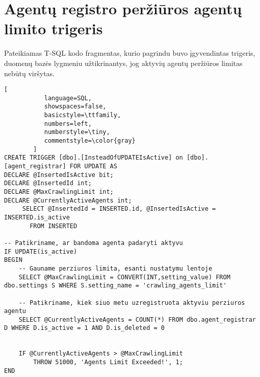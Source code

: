 \section{Agentų registro peržiūros agentų limito trigeris}

Pateikiamas T-SQL kodo fragmentas, kurio pagrindu buvo įgyvendintas trigeris, duomenų bazės lygmeniu užtikrinantys, jog aktyvių agentų peržiūros limitas nebūtų viršytas.

\label{appendix:trigger}
\begin{lstlisting}[
           language=SQL,
           showspaces=false,
           basicstyle=\ttfamily,
           numbers=left,
           numberstyle=\tiny,
           commentstyle=\color{gray}
        ]
CREATE TRIGGER [dbo].[InsteadOfUPDATEIsActive] on [dbo].[agent_registrar] FOR UPDATE AS
DECLARE @InsertedIsActive bit;
DECLARE @InsertedId int;
DECLARE @MaxCrawlingLimit int;
DECLARE @CurrentlyActiveAgents int;
     SELECT @InsertedId = INSERTED.id, @InsertedIsActive = INSERTED.is_active    
       FROM INSERTED

-- Patikriname, ar bandoma agenta padaryti aktyvu
IF UPDATE(is_active)
BEGIN
    -- Gauname perziuros limita, esanti nustatymu lentoje
	SELECT @MaxCrawlingLimit = CONVERT(INT,setting_value) FROM dbo.settings S WHERE S.setting_name = 'crawling_agents_limit'

    -- Patikriname, kiek siuo metu uzregistruota aktyviu perziuros agentu
	SELECT @CurrentlyActiveAgents = COUNT(*) FROM dbo.agent_registrar D WHERE D.is_active = 1 AND D.is_deleted = 0


	IF @CurrentlyActiveAgents > @MaxCrawlingLimit
		THROW 51000, 'Agents Limit Exceeded!', 1; 
END
\end{lstlisting}